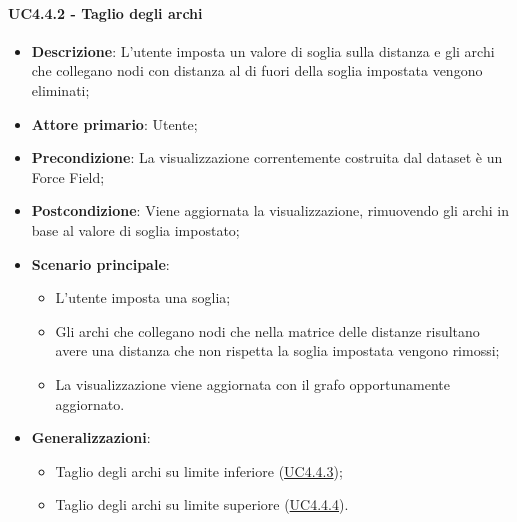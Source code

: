 \paragraph{UC4.4.2 - Taglio degli archi}
\label{par:uc4.4.2}
\begin{itemize}
    \item \textbf{Descrizione}:     L'utente imposta un valore di soglia sulla distanza e gli archi che collegano nodi con distanza al di fuori della soglia impostata vengono eliminati;
    \item \textbf{Attore primario}: Utente;
    \item \textbf{Precondizione}:   La visualizzazione correntemente costruita dal dataset è un Force Field;
    \item \textbf{Postcondizione}:  Viene aggiornata la visualizzazione, rimuovendo gli archi in base al valore di soglia impostato;
    \item \textbf{Scenario principale}:
    \begin{itemize}
        \item L'utente imposta una soglia;
        \item Gli archi che collegano nodi che nella matrice delle distanze risultano avere una distanza che non rispetta la soglia impostata vengono rimossi;
        \item La visualizzazione viene aggiornata con il grafo opportunamente aggiornato.
    \end{itemize}

    \item \textbf{Generalizzazioni}:
    \begin{itemize}
        \item Taglio degli archi su limite inferiore (\hyperref[par:uc4.4.3]{UC4.4.3});
        \item Taglio degli archi su limite superiore (\hyperref[par:uc4.4.4]{UC4.4.4}).
    \end{itemize}
\end{itemize}


